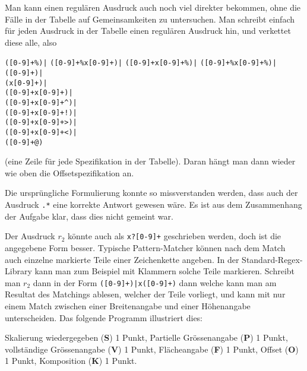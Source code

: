 \begin{loesung}
Man kann einen regulären Ausdruck auch noch viel direkter bekommen, ohne
die Fälle in der Tabelle auf Gemeinsamkeiten zu untersuchen.
Man schreibt einfach für jeden Ausdruck in der Tabelle einen regulären
Ausdruck hin, und verkettet diese alle, also
\begin{center}
\texttt{([0-9]+\%)|}
\texttt{([0-9]+\%x[0-9]+)|}
\texttt{([0-9]+x[0-9]+\%)|}
\texttt{([0-9]+\%x[0-9]+\%)|}
\\
\texttt{([0-9]+)|}
\\
\texttt{(x[0-9]+)|}
\\
\texttt{([0-9]+x[0-9]+)|}
\\
\texttt{([0-9]+x[0-9]+\^{})|}
\\
\texttt{([0-9]+x[0-9]+!)|}
\\
\texttt{([0-9]+x[0-9]+>)|}
\\
\texttt{([0-9]+x[0-9]+<)|}
\\
\texttt{([0-9]+@)}
\end{center}
(eine Zeile für jede Spezifikation in der Tabelle).
Daran hängt man dann wieder wie oben die Offset\-spezifikation an.
\end{loesung}

\begin{diskussion}
Die ursprüngliche Formulierung konnte so missverstanden werden, dass auch
der Ausdruck \texttt{.*} eine korrekte Antwort gewesen wäre.
Es ist aus dem Zusammenhang der Aufgabe klar, dass dies nicht gemeint war.
\end{diskussion}

\begin{diskussion}
Der Ausdruck $r_2$ könnte auch als \texttt{x?[0-9]+} geschrieben werden,
doch ist die angegebene Form besser.
Typische Pattern-Matcher können nach dem Match auch einzelne markierte
Teile einer Zeichenkette angeben.
In der Standard-Regex-Library kann man zum Beispiel mit Klammern solche
Teile markieren.
Schreibt man $r_2$ dann in der Form \texttt{([0-9]+)|x([0-9]+)}
dann welche kann man am Resultat des Matchings ablesen, welcher der
Teile vorliegt, und kann mit nur einem Match zwischen einer Breitenangabe
und einer Höhenangabe unterscheiden. Das folgende Programm illustriert dies:
{\small
{}
}
\end{diskussion}

\begin{bewertung}
Skalierung wiedergegeben ({\bf S}) 1 Punkt,
Partielle Grössenangabe ({\bf P}) 1 Punkt,
vollständige Grössenangabe ({\bf V}) 1 Punkt,
Flächeangabe ({\bf F}) 1 Punkt,
Offset ({\bf O}) 1 Punkt,
Komposition ({\bf K}) 1 Punkt.
\end{bewertung}
